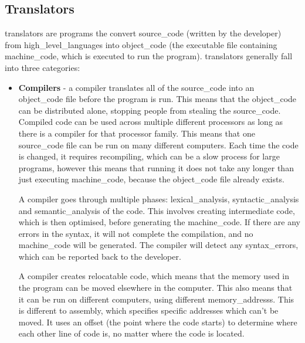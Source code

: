         \subsection{Translators}
            \Glspl{translator} are programs the convert \gls{source_code} (written by the developer) from \glspl{high_level_language} into \gls{object_code} (the executable file containing \gls{machine_code}, which is executed to run the program).
            \Glspl{translator} generally fall into three categories:
            \begin{itemize}
                \item \textbf{Compilers} - a \gls{compiler} translates all of the \gls{source_code} into an \gls{object_code} file before the program is run.
                This means that the \gls{object_code} can be distributed alone, stopping people from stealing the \gls{source_code}.
                Compiled \gls{code} can be used across multiple different processors as long as there is a \gls{compiler} for that \gls{processor} family.
                This means that one \gls{source_code} file can be run on many different computers.
                Each time the \gls{code} is changed, it requires recompiling, which can be a slow process for large programs, however this means that running it does not take any longer than just executing \gls{machine_code}, because the \gls{object_code} file already exists.

                A \gls{compiler} goes through multiple phases: \gls{lexical_analysis}, \gls{syntactic_analysis} and \gls{semantic_analysis} of the \gls{code}.
                This involves creating intermediate \gls{code}, which is then optimised, before generating the \gls{machine_code}.
                If there are any \glspl{error} in the \gls{syntax}, it will not complete the compilation, and no \gls{machine_code} will be generated.
                The \gls{compiler} will detect any \glspl{syntax_error}, which can be reported back to the developer.

                A \gls{compiler} creates relocatable \gls{code}, which means that the \gls{memory} used in the program can be moved elsewhere in the computer.
                This also means that it can be run on different computers, using different \glspl{memory_address}.
                This is different to \gls{assembly}, which specifies specific addresses which can't be moved.
                It uses an offset (the point where the \gls{code} starts) to determine where each other line of \gls{code} is, no matter where the \gls{code} is located.


\end{itemize}
